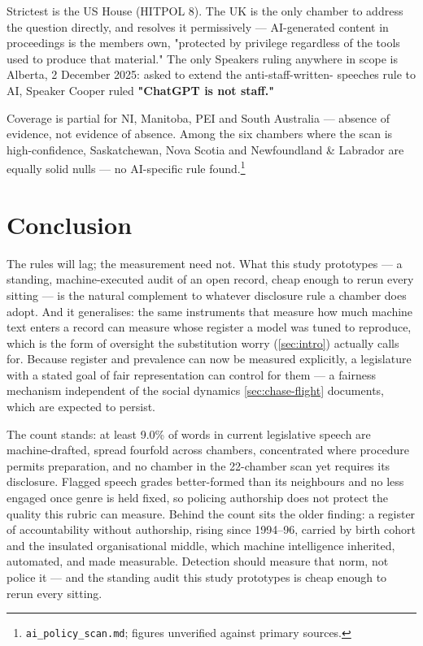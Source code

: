 Strictest is the US House (HITPOL 8). The UK is the only chamber to address
the question directly, and resolves it permissively --- AI-generated content in
proceedings is the member\textquotesingle s own, "protected by privilege regardless of the
tools used to produce that material." The only Speaker\textquotesingle s ruling anywhere in
scope is Alberta, 2 December 2025: asked to extend the anti-staff-written-
speeches rule to AI, Speaker Cooper ruled \textbf{"ChatGPT is not staff."}

Coverage is partial for NI, Manitoba, PEI and South Australia --- absence of
evidence, not evidence of absence. Among the six chambers where the scan is
high-confidence, Saskatchewan, Nova Scotia and Newfoundland \& Labrador are
equally solid nulls --- no AI-specific rule found.\footnote{\texttt{ai\_policy\_scan.md}; figures unverified against primary
  sources.}

\section{Conclusion}\label{sec:conclusion}

The rules will lag; the measurement need not. What this study prototypes ---
a standing, machine-executed audit of an open record, cheap enough to rerun
every sitting --- is the natural complement to whatever disclosure rule a
chamber does adopt. And it generalises: the same instruments that measure
how much machine text enters a record can measure whose register a model
was tuned to reproduce, which is the form of oversight the substitution
worry (\cref{sec:intro}) actually calls for. Because register and prevalence can now be
measured explicitly, a legislature with a stated goal of fair representation
can control for them --- a fairness mechanism independent of the social
dynamics \cref{sec:chase-flight} documents, which are expected to persist.

The count stands: at least 9.0\% of words in current legislative speech are
machine-drafted, spread fourfold across chambers, concentrated where procedure
permits preparation, and no chamber in the 22-chamber scan yet requires its
disclosure. Flagged speech grades better-formed than its neighbours and no less
engaged once genre is held fixed, so policing authorship does not protect the
quality this rubric can measure. Behind the count sits the older finding: a
register of accountability without authorship, rising since 1994--96, carried by
birth cohort and the insulated organisational middle, which machine
intelligence inherited, automated, and made measurable. Detection should
measure that norm, not police it --- and the standing audit this study prototypes
is cheap enough to rerun every sitting.

